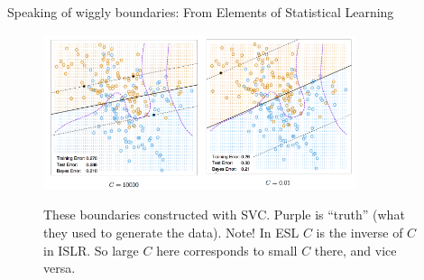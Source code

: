 \documentclass[mathserif, aspectratio=169]{beamer}
\begin{document}
\begin{frame}{Speaking of wiggly boundaries: From Elements of Statistical Learning}

\begin{figure}
\includegraphics[width=0.415\textwidth]{ESL_12_2a}\includegraphics[width=0.4\textwidth]{ESL_12_2b}
\caption*{These boundaries constructed with SVC.  Purple is ``truth'' (what they used to generate the data).  Note!  In ESL $C$ is the inverse of $C$ in ISLR.  So large $C$ here corresponds to small $C$ there, and vice versa.}
\end{figure}

\end{frame}
\end{document}
